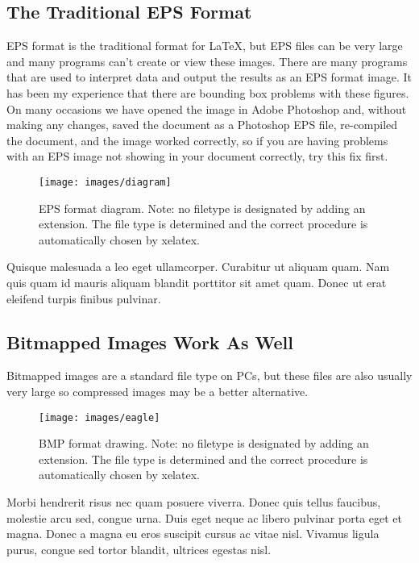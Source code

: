 \subsection{The Traditional EPS Format}

EPS format is the traditional format for LaTeX, but EPS files can be very large and many programs can't create or view these images. There are many programs that are used to interpret data and output the results as an EPS format image. It has been my experience that there are bounding box problems with these figures. On many occasions we have opened the image in Adobe Photoshop and, without making any changes, saved the document as a Photoshop EPS file, re-compiled the document, and the image worked correctly, so if you are having problems with an EPS image not showing in your document correctly, try this fix first.


\begin{figure}[htbp]
  \centering
    \texttt{[image: images/diagram]}
    \caption[EPS format diagram. Note: no filetype is designated by adding an extension.]{EPS format diagram. Note: no filetype is designated by adding an extension. The file type is determined and the correct procedure is automatically chosen by xelatex.}
\end{figure}


Quisque malesuada a leo eget ullamcorper. Curabitur ut aliquam quam. Nam quis quam id mauris aliquam blandit porttitor sit amet quam. Donec ut erat eleifend turpis finibus pulvinar.

\subsection{Bitmapped Images Work As Well}

Bitmapped images are a standard file type on PCs, but these files are also usually very large so compressed images may be a better alternative.

\begin{figure}[htbp]
  \centering
    \texttt{[image: images/eagle]}
    \caption[BMP format drawing. Note: no filetype is designated by adding an extension.]{BMP format drawing. Note: no filetype is designated by adding an extension. The file type is determined and the correct procedure is automatically chosen by xelatex.}
\end{figure}

Morbi hendrerit risus nec quam posuere viverra. Donec quis tellus faucibus, molestie arcu sed, congue urna. Duis eget neque ac libero pulvinar porta eget et magna. Donec a magna eu eros suscipit cursus ac vitae nisl. Vivamus ligula purus, congue sed tortor blandit, ultrices egestas nisl.

